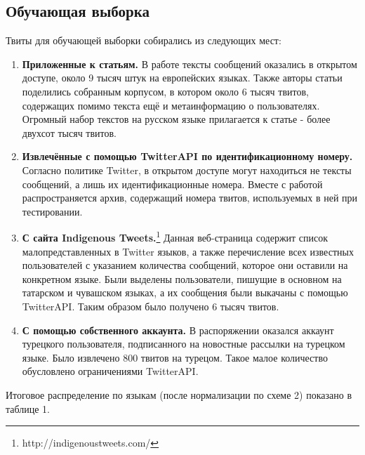 \documentclass[a4paper, 14pt]{article}
\begin{document}
		\subsection{Обучающая выборка}   
			Твиты для обучающей выборки собирались из следующих мест:
			\begin{enumerate}
				\item \textbf{Приложенные к статьям.} В работе \cite{liga} тексты сообщений оказались в открытом доступе, около 9 тысяч штук на европейских языках. Также авторы статьи \cite{ppm} поделились собранным корпусом, в котором около 6 тысяч твитов, содержащих помимо текста ещё и метаинформацию о пользователях. Огромный набор текстов на русском языке прилагается к статье \cite{julia} - более двухсот тысяч твитов.
				\item \textbf{Извлечённые с помощью TwitterAPI по идентификационному номеру.} Согласно политике Twitter, в открытом доступе могут находиться не тексты сообщений, а лишь их идентификационные номера. Вместе с работой \cite{lrev} распространяется архив, содержащий номера твитов, используемых в ней при тестировании. 
				\item \textbf{С сайта Indigenous Tweets.}\footnote{http://indigenoustweets.com/} Данная веб-страница содержит список малопредставленных в Twitter языков, а также перечисление всех известных пользователей с указанием количества сообщений, которое они оставили на конкретном языке. Были выделены пользователи, пишущие в основном на татарском и чувашском языках, а их сообщения были выкачаны с помощью TwitterAPI. Таким образом было получено 6 тысяч твитов.
				\item \textbf{С помощью собственного аккаунта.} В распоряжении оказался аккаунт турецкого пользователя, подписанного на новостные рассылки на турецком языке. Было извлечено 800 твитов на турецом. Такое малое количество обусловлено ограничениями TwitterAPI.
			\end{enumerate}		
			Итоговое распределение по языкам (после нормализации по схеме 2) показано в таблице 1.	  
			 
\end{document}
